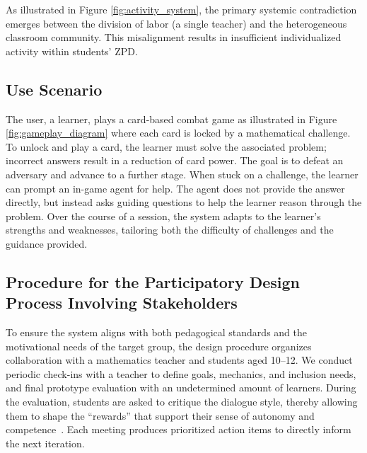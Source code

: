 

As illustrated in Figure \ref{fig:activity_system}, the primary systemic contradiction emerges between the division of labor (a single teacher) and the heterogeneous classroom community. This misalignment results in insufficient individualized activity within students' ZPD.

\subsection{Use Scenario}


The user, a learner, plays a card-based combat game as illustrated in Figure \ref{fig:gameplay_diagram} where each card is locked by a mathematical challenge. To unlock and play a card, the learner must solve the associated problem; incorrect answers result in a reduction of card power. The goal is to defeat an adversary and advance to a further stage. When stuck on a challenge, the learner can prompt an in-game agent for help. The agent does not provide the answer directly, but instead asks guiding questions to help the learner reason through the problem. Over the course of a session, the system adapts to the learner's strengths and weaknesses, tailoring both the difficulty of challenges and the guidance provided.



\subsection{Procedure for the Participatory Design Process Involving Stakeholders}


To ensure the system aligns with both pedagogical standards and the motivational needs of the target group, the design procedure organizes collaboration with a mathematics teacher and students aged 10--12. We conduct periodic check-ins with a teacher to define goals, mechanics, and inclusion needs, and final prototype evaluation with an undetermined amount of learners. During the evaluation, students are asked to critique the dialogue style, thereby allowing them to shape the \enquote{rewards} that support their sense of autonomy and competence~\cite{ryan2000self}. Each meeting produces prioritized action items to directly inform the next iteration.

